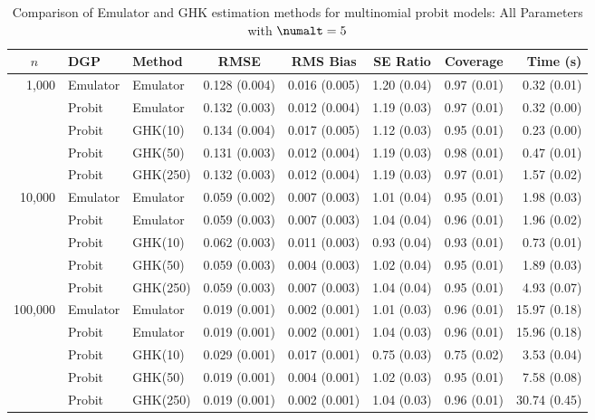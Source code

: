 \begin{table}[htbp]
\centering
\footnotesize
\begin{tabular}{@{}rllrrrrr@{}}
\toprule
\multicolumn{1}{c}{$n$} & \multicolumn{1}{l}{DGP} & \multicolumn{1}{l}{Method} & \multicolumn{1}{c}{RMSE} & \multicolumn{1}{c}{RMS Bias} & \multicolumn{1}{c}{SE Ratio} & \multicolumn{1}{c}{Coverage} & \multicolumn{1}{r}{Time (s)} \\
\midrule
\multirow{5}{*}{1,000} & Emulator & Emulator & 0.128 (0.004) & 0.016 (0.005) & 1.20 (0.04) & 0.97 (0.01) & 0.32 (0.01) \\
 & Probit & Emulator & 0.132 (0.003) & 0.012 (0.004) & 1.19 (0.03) & 0.97 (0.01) & 0.32 (0.00) \\
 & Probit & GHK(10) & 0.134 (0.004) & 0.017 (0.005) & 1.12 (0.03) & 0.95 (0.01) & 0.23 (0.00) \\
 & Probit & GHK(50) & 0.131 (0.003) & 0.012 (0.004) & 1.19 (0.03) & 0.98 (0.01) & 0.47 (0.01) \\
 & Probit & GHK(250) & 0.132 (0.003) & 0.012 (0.004) & 1.19 (0.03) & 0.97 (0.01) & 1.57 (0.02) \\
\midrule
\multirow{5}{*}{10,000} & Emulator & Emulator & 0.059 (0.002) & 0.007 (0.003) & 1.01 (0.04) & 0.95 (0.01) & 1.98 (0.03) \\
 & Probit & Emulator & 0.059 (0.003) & 0.007 (0.003) & 1.04 (0.04) & 0.96 (0.01) & 1.96 (0.02) \\
 & Probit & GHK(10) & 0.062 (0.003) & 0.011 (0.003) & 0.93 (0.04) & 0.93 (0.01) & 0.73 (0.01) \\
 & Probit & GHK(50) & 0.059 (0.003) & 0.004 (0.003) & 1.02 (0.04) & 0.95 (0.01) & 1.89 (0.03) \\
 & Probit & GHK(250) & 0.059 (0.003) & 0.007 (0.003) & 1.04 (0.04) & 0.95 (0.01) & 4.93 (0.07) \\
\midrule
\multirow{5}{*}{100,000} & Emulator & Emulator & 0.019 (0.001) & 0.002 (0.001) & 1.01 (0.03) & 0.96 (0.01) & 15.97 (0.18) \\
 & Probit & Emulator & 0.019 (0.001) & 0.002 (0.001) & 1.04 (0.03) & 0.96 (0.01) & 15.96 (0.18) \\
 & Probit & GHK(10) & 0.029 (0.001) & 0.017 (0.001) & 0.75 (0.03) & 0.75 (0.02) & 3.53 (0.04) \\
 & Probit & GHK(50) & 0.019 (0.001) & 0.004 (0.001) & 1.02 (0.03) & 0.95 (0.01) & 7.58 (0.08) \\
 & Probit & GHK(250) & 0.019 (0.001) & 0.002 (0.001) & 1.04 (0.03) & 0.96 (0.01) & 30.74 (0.45) \\
\bottomrule
\end{tabular}
\caption{Comparison of Emulator and GHK estimation methods for multinomial probit models: All Parameters with $\numalt=5$}
\label{tab:emulator_vs_ghk:5:all}
\end{table}